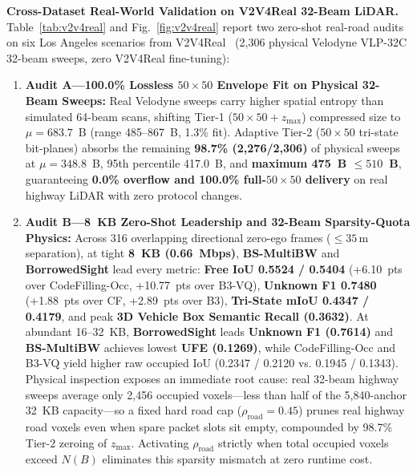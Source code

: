 \documentclass[journal]{IEEEtran}
\begin{document}
\textbf{Cross-Dataset Real-World Validation on V2V4Real 32-Beam LiDAR.} Table~\ref{tab:v2v4real} and Fig.~\ref{fig:v2v4real} report two zero-shot real-road audits on six Los Angeles scenarios from V2V4Real~\cite{xu2023v2v4real} (2,306 physical Velodyne VLP-32C 32-beam sweeps, zero V2V4Real fine-tuning):
\begin{enumerate}
\item \textbf{Audit A---100.0\% Lossless $50\times 50$ Envelope Fit on Physical 32-Beam Sweeps:} Real Velodyne sweeps carry higher spatial entropy than simulated 64-beam scans, shifting Tier-1 ($50\times 50 + z_{\max}$) compressed size to $\mu = 683.7$~B (range 485--867~B, 1.3\% fit). Adaptive Tier-2 ($50\times 50$ tri-state bit-planes) absorbs the remaining \textbf{98.7\% (2,276/2,306)} of physical sweeps at $\mu = 348.8$~B, 95th percentile 417.0~B, and \textbf{maximum 475~B $\le 510$~B}, guaranteeing \textbf{0.0\% overflow and 100.0\% full-$50\times 50$ delivery} on real highway LiDAR with zero protocol changes.
\item \textbf{Audit B---8~KB Zero-Shot Leadership and 32-Beam Sparsity-Quota Physics:} Across 316 overlapping directional zero-ego frames ($\le 35\,\mathrm{m}$ separation), at tight \textbf{8~KB (0.66~Mbps)}, \textbf{BS-MultiBW} and \textbf{BorrowedSight} lead every metric: \textbf{Free IoU 0.5524 / 0.5404} (+6.10~pts over CodeFilling-Occ, +10.77~pts over B3-VQ), \textbf{Unknown F1 0.7480} (+1.88~pts over CF, +2.89~pts over B3), \textbf{Tri-State mIoU 0.4347 / 0.4179}, and peak \textbf{3D Vehicle Box Semantic Recall (0.3632)}. At abundant 16--32~KB, \textbf{BorrowedSight} leads \textbf{Unknown F1 (0.7614)} and \textbf{BS-MultiBW} achieves lowest \textbf{UFE (0.1269)}, while CodeFilling-Occ and B3-VQ yield higher raw occupied IoU (0.2347 / 0.2120 vs. 0.1945 / 0.1343). Physical inspection exposes an immediate root cause: real 32-beam highway sweeps average only 2,456 occupied voxels---less than half of the 5,840-anchor 32~KB capacity---so a fixed hard road cap ($\rho_{\mathrm{road}} = 0.45$) prunes real highway road voxels even when spare packet slots sit empty, compounded by 98.7\% Tier-2 zeroing of $z_{\max}$. Activating $\rho_{\mathrm{road}}$ strictly when total occupied voxels exceed $N(B)$ eliminates this sparsity mismatch at zero runtime cost.
\end{enumerate}
\end{document}
